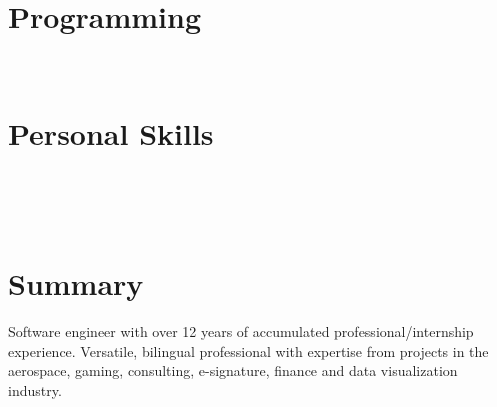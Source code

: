 \documentclass[]{friggeri-cv}
\begin{document}
\begin{aside}
  \section{Programming}
    ~
  \section{Personal Skills}
    ~
\end{aside}
~
\section{Summary}

Software engineer with over 12 years of accumulated professional/internship experience. Versatile, bilingual professional with expertise from projects in the aerospace, gaming, consulting, e-signature, finance and data visualization industry.
\end{document}

